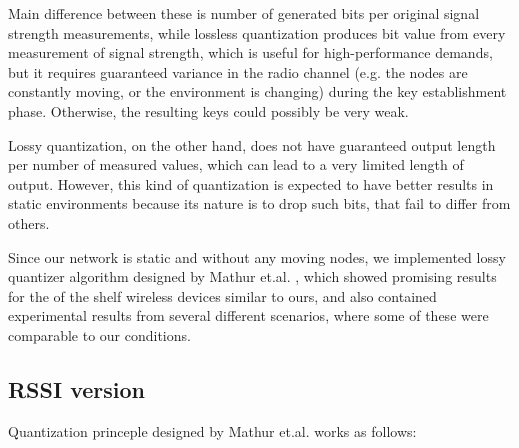 \documentclass[
  digital, %
  table,   %
  nolof,     %
  nolot,     %
           oneside
]{fithesis3}
\begin{document}
    Main difference between these is number of generated bits per original signal strength measurements, while lossless quantization produces bit value from every measurement of signal strength, which is useful for high-performance demands, but it requires guaranteed variance in the radio channel (e.g. the nodes are constantly moving, or the environment is changing) during the key establishment phase. %
    Otherwise, the resulting keys could possibly be very weak. %

    Lossy quantization, on the other hand, does not have guaranteed output length per number of measured values, which can lead to a very limited length of output. However, this kind of quantization is expected to have better results in static environments %
    because its nature is to drop such bits, that fail to differ from others.

    Since our network is static and without any moving nodes, we implemented lossy quantizer algorithm designed by Mathur et.al.%
    , which showed promising results for the of the shelf wireless devices similar to ours, and also contained experimental results from several different scenarios, where some of these were comparable to our conditions.

    \subsection{RSSI version}
    Quantization princeple designed by Mathur et.al. %
     works as follows:
\end{document}
